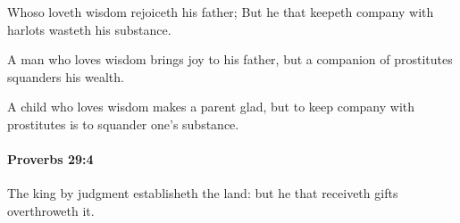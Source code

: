 			\begin{versebox}
					\item[BHS] 
					\item[ASV] Whoso loveth wisdom rejoiceth his father; But he that keepeth company with harlots wasteth his substance.
					\item[NIV] A man who loves wisdom brings joy to his father, but a companion of prostitutes squanders his wealth.
					\item[NRSV] A child who loves wisdom makes a parent glad, but to keep company with prostitutes is to squander one’s substance.
			\end{versebox}

		\paragraph{Proverbs 29:4} %
			\label{PROVERBS-29-4}

			The king by judgment establisheth the land: but he that receiveth gifts overthroweth it.

